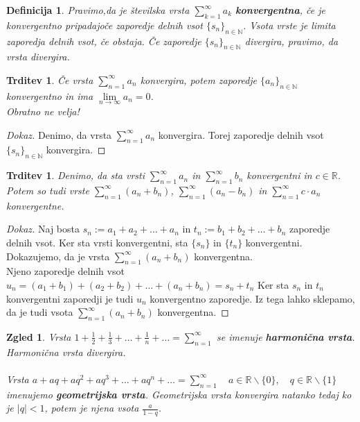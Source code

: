 \documentclass[11pt]{article}
\newtheorem{Trditev}[Izrek]{{\sc Trditev}}
\newtheorem{Definicija}[Izrek]{{\sc Definicija}}
\newtheorem{Zgled}[Izrek]{{\sc Zgled}}
\newenvironment{zgled}{\begin{Zgled}\rm }{\end{Zgled}}
\newenvironment{dokaz}[1][{\sc Dokaz}]{\begin{proof}[#1]\renewcommand*{\qedsymbol}{\(\blacksquare\)}}{\end{proof}}
\begin{document}
\begin{Definicija}
	Pravimo,da je številska vrsta $\sum_{k = 1}^{\infty}{a_k}$ \textbf{konvergentna}, če je konvergentno pripadajoče zaporedje delnih vsot  $\{s_n\}_{n\in \mathbb{N}}$.
	Vsota vrste je limita zaporedja delnih vsot, če obstaja. Če zaporedje  $\{s_n\}_{n\in \mathbb{N}}$ divergira, pravimo, da vrsta divergira.
\end{Definicija}
\begin{Trditev}
	Če vrsta $\sum_{n = 1}^{\infty}{a_n}$ konvergira, potem zaporedje  $\{a_n\}_{n\in \mathbb{N}}$ konvergentno in ima $\lim\limits_{n \to \infty}{a_n} = 0$.
	\\
	Obratno ne velja!
\end{Trditev}
\begin{dokaz}
	Denimo, da vrsta $\sum_{n = 1}^{\infty}{a_n}$ konvergira. Torej zaporedje delnih vsot  $\{s_n\}_{n\in \mathbb{N}}$ konvergira.
\end{dokaz}
\begin{Trditev}
	Denimo, da sta vrsti $\sum_{n = 1}^{\infty}{a_n}$ in $\sum_{n = 1}^{\infty}{b_n}$ konvergentni in $c \in \mathbb{R}$. Potem so tudi vrste $\sum_{n = 1}^{\infty}{(a_n+ b_n)}$, $\sum_{n = 1}^{\infty}{(a_n - b_n)}$  in $\sum_{n = 1}^{\infty}{c \cdot a_n}$ konvergentne. 
\end{Trditev}

\begin{dokaz}
	Naj bosta $s_n := a_1 + a_2 + \dots + a_n$ in $t_n := b_1 + b_2 + \dots + b_n$ zaporedje delnih vsot. Ker sta vrsti konvergentni, sta $\{s_n\}$ in $\{t_n\}$ konvergentni. Dokazujemo, da je vrsta $\sum_{n = 1}^{\infty}{(a_n+ b_n)}$ konvergentna.
	\\
	Njeno zaporedje delnih vsot $u_n = (a_1 + b_1) + (a_2 + b_2) + \dots + (a_n + b_n) = s_n + t_n$ Ker sta $s_n$ in $t_n$ konvergentni zaporedji je tudi $u_n$ konvergentno zaporedje. Iz tega lahko sklepamo, da je tudi vsota $\sum_{n = 1}^{\infty}{(a_n+ b_n)}$ konvergentna.
\end{dokaz}
\begin{zgled}
	Vrsta $ 1 + \frac{1}{2} + \frac{1}{3} + \dots + \frac{1}{n} + \dots = \sum_{n = 1}^{\infty}$ se imenuje \textbf{harmonična vrsta}. Harmonična vrsta divergira.
	\\
	\\
	Vrsta $a + aq + aq^2 +aq^3 + \dots + aq^n + \dots = \sum_{n = 1}^{\infty} \quad a\in \mathbb{R}\backslash \{0\}, \quad q\in \mathbb{R} \backslash \{1\}$ imenujemo \textbf{geometrijska vrsta}. Geometrijska vrsta konvergira natanko tedaj ko je $|q| < 1$, potem je njena vsota $ \frac{a}{1 - q}$.
\end{zgled}
\end{document}
